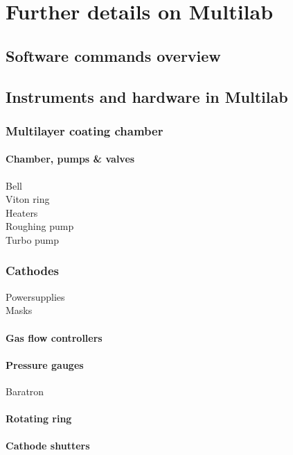 \chapter{Further details on Multilab}\label{chap:multilab_details}

\section{Software commands overview}

\section{Instruments and hardware in Multilab}

\subsection{Multilayer coating chamber}\label{sec:ml_chamber}

\subsubsection{Chamber, pumps \& valves}
Bell\\
Viton ring\\
Heaters\\
Roughing pump\\
Turbo pump

\subsection{Cathodes}
Powersupplies\\
Masks\\

\subsubsection{Gas flow controllers}

\subsubsection{Pressure gauges}
Baratron\\

\subsubsection{Rotating ring}

\subsubsection{Cathode shutters}

